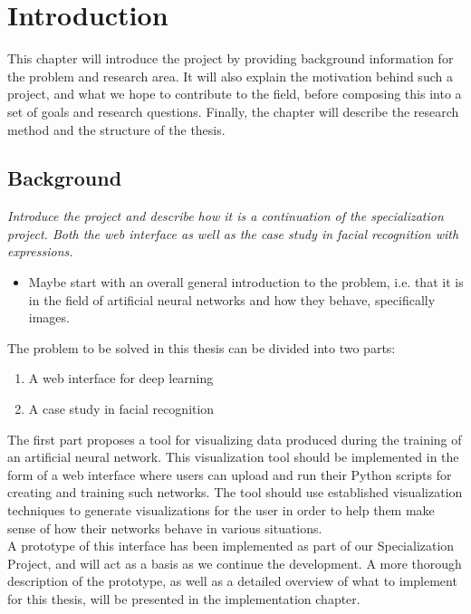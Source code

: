 \chapter{Introduction}

This chapter will introduce the project by providing background information for the problem and research area. It will also explain the motivation behind such a project, and what we hope to contribute to the field, before composing this into a set of goals and research questions. Finally, the chapter will describe the research method and the structure of the thesis.

\section{Background}

\textit{Introduce the project and describe how it is a continuation of the specialization project. Both the web interface as well as the case study in facial recognition with expressions.}

\begin{itemize}
    \item Maybe start with an overall general introduction to the problem, i.e. that it is in the field of artificial neural networks and how they behave, specifically images.
\end{itemize}

\noindent The problem to be solved in this thesis can be divided into two parts:
\begin{enumerate}
    \item A web interface for deep learning
    \item A case study in facial recognition
\end{enumerate}

\noindent The first part proposes a tool for visualizing data produced during the training of an artificial neural network. This visualization tool should be implemented in the form of a web interface where users can upload and run their Python scripts for creating and training such networks. The tool should use established visualization techniques to generate visualizations for the user in order to help them make sense of how their networks behave in various situations. \\

\noindent A prototype of this interface has been implemented as part of our Specialization Project, and will act as a basis as we continue the development. A more thorough description of the prototype, as well as a detailed overview of what to implement for this thesis, will be presented in the implementation chapter. \\

